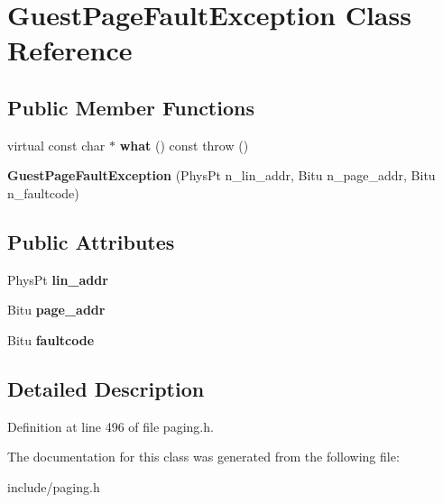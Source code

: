 \hypertarget{classGuestPageFaultException}{\section{Guest\-Page\-Fault\-Exception Class Reference}
\label{classGuestPageFaultException}
}
\subsection*{Public Member Functions}
\begin{DoxyCompactItemize}
\item 
\hypertarget{classGuestPageFaultException_a1bebaa50f525dd7556d947e96936b3b9}{virtual const char $\ast$ {\bfseries what} () const   throw ()}\label{classGuestPageFaultException_a1bebaa50f525dd7556d947e96936b3b9}

\item 
\hypertarget{classGuestPageFaultException_a2e8fc056edd06f2f4d466a2f2a09af5f}{{\bfseries Guest\-Page\-Fault\-Exception} (Phys\-Pt n\-\_\-lin\-\_\-addr, Bitu n\-\_\-page\-\_\-addr, Bitu n\-\_\-faultcode)}\label{classGuestPageFaultException_a2e8fc056edd06f2f4d466a2f2a09af5f}

\end{DoxyCompactItemize}
\subsection*{Public Attributes}
\begin{DoxyCompactItemize}
\item 
\hypertarget{classGuestPageFaultException_ab1a92143880433da862396ee81c28328}{Phys\-Pt {\bfseries lin\-\_\-addr}}\label{classGuestPageFaultException_ab1a92143880433da862396ee81c28328}

\item 
\hypertarget{classGuestPageFaultException_ab38013309d0af12e5c9def2b0c8ff77a}{Bitu {\bfseries page\-\_\-addr}}\label{classGuestPageFaultException_ab38013309d0af12e5c9def2b0c8ff77a}

\item 
\hypertarget{classGuestPageFaultException_a49906c9d52468c91f0b6218de7f21cc1}{Bitu {\bfseries faultcode}}\label{classGuestPageFaultException_a49906c9d52468c91f0b6218de7f21cc1}

\end{DoxyCompactItemize}


\subsection{Detailed Description}


Definition at line 496 of file paging.\-h.



The documentation for this class was generated from the following file\-:\begin{DoxyCompactItemize}
\item 
include/paging.\-h\end{DoxyCompactItemize}
